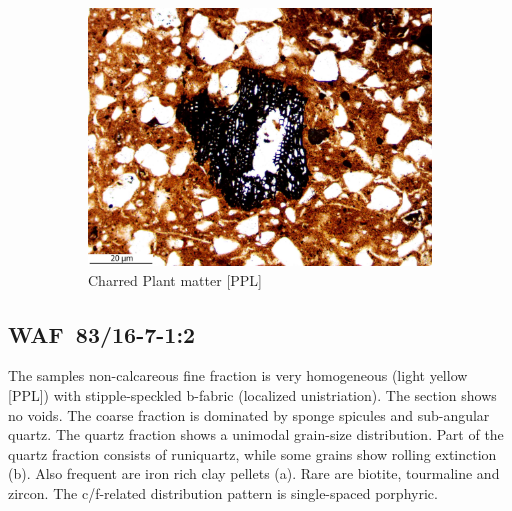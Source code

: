 \documentclass[a4paper]{article}
\begin{document}
\begin{figure}[H]
\begin{subfigure}[t]{.32\textwidth}
		\includegraphics[width=\textwidth]{ThinSections/96-7_10x_PPL.jpg}
		\caption{Charred Plant matter [PPL]}
	\end{subfigure}
	\caption{}
	\label{fig:96_waf}
\end{figure}

\newpage\subsection{WAF~83/16-7-1:2 \citep[waf\#49; Fig.~\ref{fig:wafmon.pottery}.7; Longa style;][503 Pl.~69.9]{Wotzka.1995}}

\begin{multicols}{2}
\noindent The samples non-calcareous fine fraction is very homogeneous (light yellow [PPL]) with stipple-speckled b-fabric (localized unistriation). The section shows no voids. The coarse fraction is dominated by sponge spicules and sub-angular quartz. The quartz fraction shows a unimodal grain-size distribution. Part of the quartz fraction consists of runiquartz, while some grains show rolling extinction (b). Also frequent are iron rich clay pellets (a). Rare are biotite, tourmaline and zircon. The c/f-related distribution pattern is single-spaced porphyric.
\end{multicols}
\end{document}
